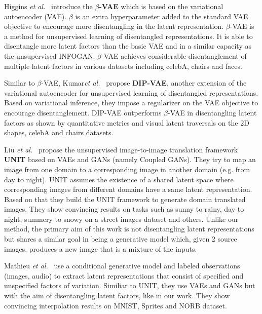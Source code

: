 \documentclass[a4paper,12pt]{report}
\begin{document}
\par Higgins \textit{et al.}~\cite{betaVAE} introduce the \textbf{$\beta$-VAE} which is based on the variational autoencoder (VAE). $\beta$ is an extra hyperparameter added to the standard VAE objective to encourage more disentangling in the latent representation. $\beta$-VAE is a method for unsupervised learning of disentangled representations. It is able to disentangle more latent factors than the basic VAE and in a similar capacity as the unsupervised INFOGAN. $\beta$-VAE achieves considerable disentanglement of multiple latent factors in various datasets including celebA, chairs and faces.

Similar to $\beta$-VAE, Kumar\textit{et al.}~\cite{DIPVAE} propose \textbf{DIP-VAE}, another extension of the variational autoencoder for unsupervised learning of disentangled representations. Based on variational inference, they impose a regularizer on the VAE objective to encourage disentanglement. DIP-VAE outperforms $\beta$-VAE in disentangling latent factors as shown by quantitative metrics and visual latent traversals on the 2D shapes, celebA and chairs datasets.

Liu \textit{et al.}~\cite{UNIT} propose the unsupervised image-to-image translation framework \textbf{UNIT} based on VAEs and GANs (namely Coupled GANs). They try to map an image from one domain to a corresponding image in another domain (e.g. from day to night). UNIT assumes the existence of a shared latent space where corresponding images from different domains have a same latent representation. Based on that they build the UNIT framework to generate domain translated images. They show convincing results on tasks such as sunny to rainy, day to night, summery to snowy on a street images dataset and others. Unlike our method, the primary aim of this work is not disentangling latent representations but shares a similar goal in being a generative model which, given 2 source images, produces a new image that is a mixture of the inputs.

Mathieu \textit{et al.}~\cite{1611.03383} use a conditional generative model and labeled observations (images, audio) to extract latent representations that consist of specified and unspecified factors of variation. Similiar to UNIT, they use VAEs and GANs but with the aim of disentangling latent factors, like in our work. They show convincing interpolation results on MNIST, Sprites and NORB dataset.
\end{document}
